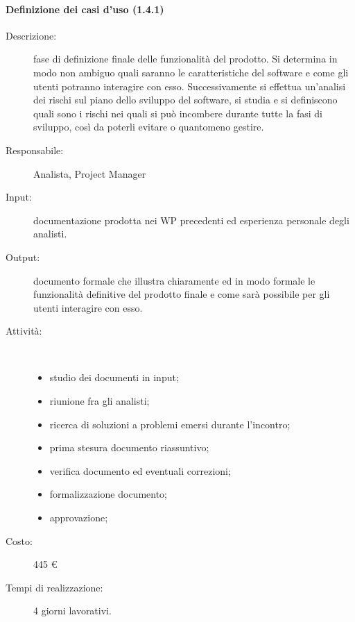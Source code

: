 \paragraph{Definizione dei casi d'uso (1.4.1)}
\begin{description}
\item[Descrizione:]fase di definizione finale delle funzionalit\`{a} del prodotto. Si determina in modo non ambiguo quali saranno le caratteristiche del software e come gli utenti potranno interagire con esso. Successivamente si effettua un'analisi dei rischi sul piano dello sviluppo del software, si studia e si definiscono quali sono i rischi nei quali si pu\`{o} incombere durante tutte la fasi di sviluppo, cos\`{i} da poterli evitare o quantomeno gestire.
\item[Responsabile:] Analista, Project Manager
\item[Input: ]documentazione prodotta nei WP precedenti ed esperienza personale degli analisti.
\item[Output:] documento formale che illustra chiaramente ed in modo formale le funzionalità definitive del prodotto finale e come sarà possibile per gli utenti interagire con esso.
\item[Attività:]\mbox{}\\[-1.5\baselineskip]
	\begin{itemize}
	\item studio dei documenti in input;
	\item riunione fra gli analisti;
	\item ricerca di soluzioni a problemi emersi durante l'incontro;
	\item prima stesura documento riassuntivo;
	\item verifica documento ed eventuali correzioni;
	\item formalizzazione documento;
	\item approvazione;
	\end{itemize}
\item[Costo:] 445 \euro{}
\item[Tempi di realizzazione:] 4 giorni lavorativi.
\end{description}

